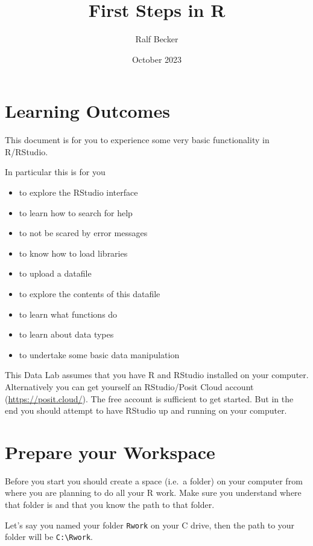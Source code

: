 \documentclass[
]{article}
\title{First Steps in R}
\author{Ralf Becker}
\date{October 2023}
\providecommand{\tightlist}{%
  \setlength{\itemsep}{0pt}\setlength{\parskip}{0pt}}
\begin{document}
\maketitle

\hypertarget{learning-outcomes}{%
\section{Learning Outcomes}\label{learning-outcomes}}

This document is for you to experience some very basic functionality in
R/RStudio.

In particular this is for you

\begin{itemize}
\tightlist
\item
  to explore the RStudio interface
\item
  to learn how to search for help
\item
  to not be scared by error messages
\item
  to know how to load libraries
\item
  to upload a datafile
\item
  to explore the contents of this datafile
\item
  to learn what functions do
\item
  to learn about data types
\item
  to undertake some basic data manipulation
\end{itemize}

This Data Lab assumes that you have R and RStudio installed on your
computer. Alternatively you can get yourself an RStudio/Posit Cloud
account (\url{https://posit.cloud/}). The free account is sufficient to
get started. But in the end you should attempt to have RStudio up and
running on your computer.

\hypertarget{prepare-your-workspace}{%
\section{Prepare your Workspace}\label{prepare-your-workspace}}

Before you start you should create a space (i.e.~a folder) on your
computer from where you are planning to do all your R work. Make sure
you understand where that folder is and that you know the path to that
folder.

Let's say you named your folder \texttt{Rwork} on your C drive, then the
path to your folder will be \texttt{C:\textbackslash{}Rwork}.
\end{document}
